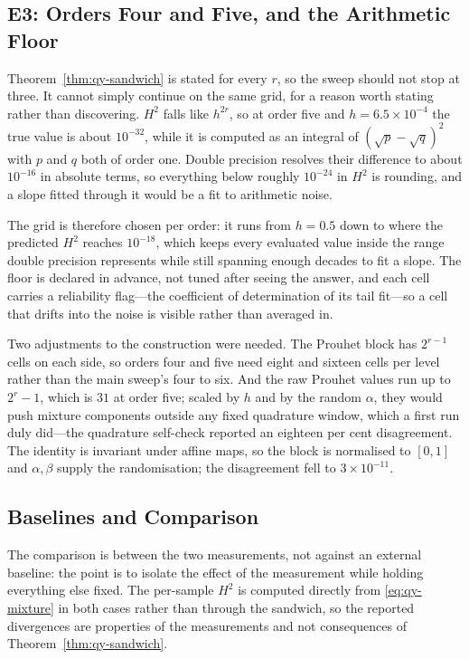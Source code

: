 \subsection{E3: Orders Four and Five, and the Arithmetic Floor}
\label{sec:qy-e3}

Theorem~\ref{thm:qy-sandwich} is stated for every $r$, so the sweep should not stop at three. It
cannot simply continue on the same grid, for a reason worth stating rather than discovering.
$H^{2}$ falls like $h^{2r}$, so at order five and $h=6.5\times10^{-4}$ the true value is
about $10^{-32}$, while it is computed as an integral of
$(\sqrt{p}-\sqrt{q})^{2}$ with $p$ and $q$ both of order one. Double precision resolves their
difference to about $10^{-16}$ in absolute terms, so everything below roughly $10^{-24}$ in
$H^{2}$ is rounding, and a slope fitted through it would be a fit to arithmetic noise.

The grid is therefore chosen per order: it runs from $h=0.5$ down to where the predicted
$H^{2}$ reaches $10^{-18}$, which keeps every evaluated value inside the range double
precision represents while still spanning enough decades to fit a slope. The floor is
declared in advance, not tuned after seeing the answer, and each cell carries a reliability
flag---the coefficient of determination of its tail fit---so a cell that drifts into the
noise is visible rather than averaged in.

Two adjustments to the construction were needed. The Prouhet block has $2^{r-1}$ cells on
each side, so orders four and five need eight and sixteen cells per level rather than the
main sweep's four to six. And the raw Prouhet values run up to $2^{r}-1$, which is $31$ at
order five; scaled by $h$ and by the random $\alpha$, they would push mixture components
outside any fixed quadrature window, which a first run duly did---the quadrature self-check
reported an eighteen per cent disagreement. The identity is invariant under affine maps, so
the block is normalised to $[0,1]$ and $\alpha,\beta$ supply the randomisation; the
disagreement fell to $3\times10^{-11}$.

\subsection{Baselines and Comparison}

The comparison is between the two measurements, not against an external baseline: the point
is to isolate the effect of the measurement while holding everything else fixed. The
per-sample $H^{2}$ is computed directly from \eqref{eq:qy-mixture} in both cases rather than
through the sandwich, so the reported divergences are properties of the measurements and not
consequences of Theorem~\ref{thm:qy-sandwich}.

